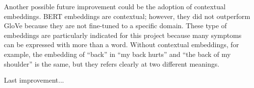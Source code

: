 Another possible future improvement could be the adoption of contextual embeddings. BERT embeddings are contextual; however, they did not outperform GloVe because they are not fine-tuned to a specific domain. These type of embeddings are particularly indicated for this project because many symptoms can be expressed with more than a word. Without contextual embeddings, for example, the embedding of ``back'' in ``my back hurts'' and ``the back of my shoulder'' is the same, but they refers clearly at two different meanings.

Last improvement...


